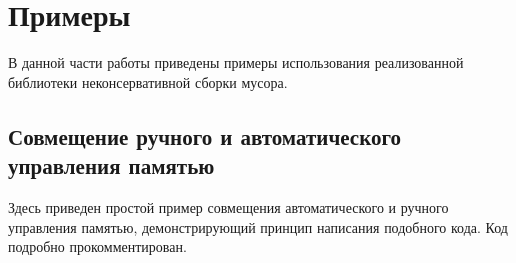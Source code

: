 \section{Примеры}
В данной части работы приведены примеры использования реализованной библиотеки неконсервативной сборки мусора.

\subsection{Совмещение ручного и автоматического управления памятью}
Здесь приведен простой пример совмещения автоматического и ручного управления памятью,
демонстрирующий принцип написания подобного кода.
Код подробно прокомментирован.

%
